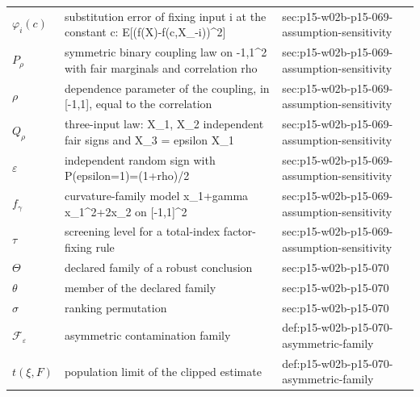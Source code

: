 \begin{longtable}{@{}p{}p{}p{}@{}}
\(\varphi_i(c)\) & substitution error of fixing input i at the constant c: E[(f(X)-f(c,X\_{-i}))\^{}2] & sec:\allowbreak{}p15-\allowbreak{}w02b-\allowbreak{}p15-\allowbreak{}069-\allowbreak{}assumption-\allowbreak{}sensitivity \\
\(P_\rho\) & symmetric binary coupling law on {-1,1}\^{}2 with fair marginals and correlation rho & sec:\allowbreak{}p15-\allowbreak{}w02b-\allowbreak{}p15-\allowbreak{}069-\allowbreak{}assumption-\allowbreak{}sensitivity \\
\(\rho\) & dependence parameter of the coupling, in [-1,1], equal to the correlation & sec:\allowbreak{}p15-\allowbreak{}w02b-\allowbreak{}p15-\allowbreak{}069-\allowbreak{}assumption-\allowbreak{}sensitivity \\
\(Q_\rho\) & three-input law: X\_1, X\_2 independent fair signs and X\_3 = epsilon X\_1 & sec:\allowbreak{}p15-\allowbreak{}w02b-\allowbreak{}p15-\allowbreak{}069-\allowbreak{}assumption-\allowbreak{}sensitivity \\
\(\varepsilon\) & independent random sign with P(epsilon=1)=(1+rho)/2 & sec:\allowbreak{}p15-\allowbreak{}w02b-\allowbreak{}p15-\allowbreak{}069-\allowbreak{}assumption-\allowbreak{}sensitivity \\
\(f_\gamma\) & curvature-family model x\_1+gamma x\_1\^{}2+2x\_2 on [-1,1]\^{}2 & sec:\allowbreak{}p15-\allowbreak{}w02b-\allowbreak{}p15-\allowbreak{}069-\allowbreak{}assumption-\allowbreak{}sensitivity \\
\(\tau\) & screening level for a total-index factor-fixing rule & sec:\allowbreak{}p15-\allowbreak{}w02b-\allowbreak{}p15-\allowbreak{}069-\allowbreak{}assumption-\allowbreak{}sensitivity \\
\(\Theta\) & declared family of a robust conclusion & sec:\allowbreak{}p15-\allowbreak{}w02b-\allowbreak{}p15-\allowbreak{}070 \\
\(\theta\) & member of the declared family & sec:\allowbreak{}p15-\allowbreak{}w02b-\allowbreak{}p15-\allowbreak{}070 \\
\(\sigma\) & ranking permutation & sec:\allowbreak{}p15-\allowbreak{}w02b-\allowbreak{}p15-\allowbreak{}070 \\
\(\mathcal F_\varepsilon\) & asymmetric contamination family & def:\allowbreak{}p15-\allowbreak{}w02b-\allowbreak{}p15-\allowbreak{}070-\allowbreak{}asymmetric-\allowbreak{}family \\
\(t(\xi,\allowbreak F)\) & population limit of the clipped estimate & def:\allowbreak{}p15-\allowbreak{}w02b-\allowbreak{}p15-\allowbreak{}070-\allowbreak{}asymmetric-\allowbreak{}family \\

\end{longtable}
